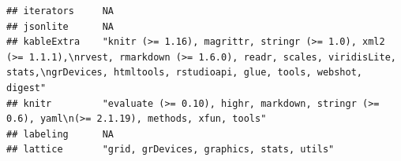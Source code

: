 \documentclass[]{article}
\begin{document}
\begin{verbatim}
## iterators     NA                                                                                                                                                                                                                                                                                                                                                                                                                                                                                    
## jsonlite      NA                                                                                                                                                                                                                                                                                                                                                                                                                                                                                    
## kableExtra    "knitr (>= 1.16), magrittr, stringr (>= 1.0), xml2 (>= 1.1.1),\nrvest, rmarkdown (>= 1.6.0), readr, scales, viridisLite, stats,\ngrDevices, htmltools, rstudioapi, glue, tools, webshot, digest"                                                                                                                                                                                                                                                                                      
## knitr         "evaluate (>= 0.10), highr, markdown, stringr (>= 0.6), yaml\n(>= 2.1.19), methods, xfun, tools"                                                                                                                                                                                                                                                                                                                                                                                      
## labeling      NA                                                                                                                                                                                                                                                                                                                                                                                                                                                                                    
## lattice       "grid, grDevices, graphics, stats, utils"                                                                                                                                                                                                                                                                                                                                                                                                                                             

\end{verbatim}
\end{document}
